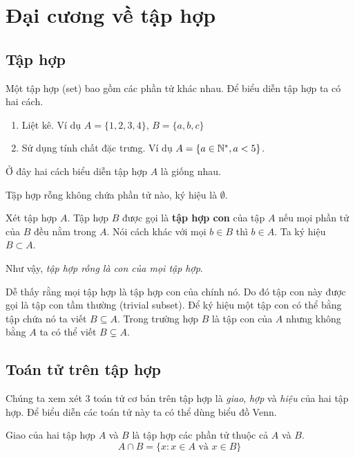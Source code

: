 \chapter{Đại cương về tập hợp}

\section{Tập hợp}

Một tập hợp (set) bao gồm các phần tử khác nhau. Để biểu diễn tập hợp
ta có hai cách.

\begin{enumerate}
    \item Liệt kê. Ví dụ $A = \{ 1, 2, 3, 4 \}$, $B = \{ a, b , c \}$
    \item Sử dụng tính chất đặc trưng. Ví dụ $A = \{ a \in \mathbb{N}^*, a < 5 \}$.
\end{enumerate}

Ở đây hai cách biểu diễn tập hợp $A$ là giống nhau.

\begin{definition}
    Tập hợp rỗng không chứa phần tử nào, ký hiệu là $\emptyset$.
\end{definition}

\begin{definition}
    Xét tập hợp $A$. Tập hợp $B$ được gọi là \textbf{tập hợp con} của tập $A$
    nếu mọi phần tử của $B$ đều nằm trong $A$. Nói cách khác với mọi $b \in B$ thì
    $b \in A$. Ta ký hiệu $B \subset A$.
\end{definition}

Như vậy, \textit{tập hợp rỗng là con của mọi tập hợp}.

Dễ thấy rằng mọi tập hợp là tập hợp con của chính nó. Do đó tập con này được gọi là
tập con tầm thường (trivial subset). Để ký hiệu một tập con có thể bằng tập chứa nó
ta viết $B \subseteq A$. Trong trường hợp $B$ là tập con của $A$ nhưng không bằng 
$A$ ta có thể viết $B \subsetneq A$.

\section{Toán tử trên tập hợp}

Chúng ta xem xét 3 toán tử cơ bản trên tập hợp là \textit{giao}, \textit{hợp}
và \textit{hiệu} của hai tập hợp. Để biểu diễn các toán tử này ta có thể dùng 
biểu đồ Venn.

\begin{definition}
    Giao của hai tập hợp $A$ và $B$ là tập hợp các phần tử thuộc cả $A$ và $B$.
    \begin{equation}
        A \cap B = \{ x : x \in A \text{ và } x \in B \}
    \end{equation}
\end{definition}

